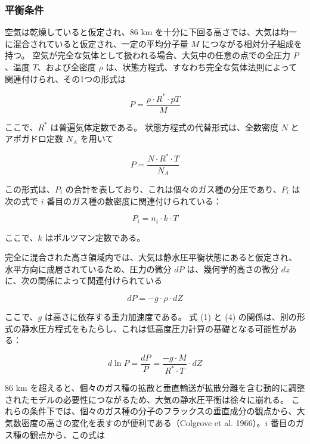 \documentclass{article}
\begin{document}
\subsubsection{平衡条件}
空気は乾燥していると仮定され、86 km を十分に下回る高さでは、大気は均一に混合されていると仮定され、一定の平均分子量 $M$ につながる相対分子組成を持つ。
空気が完全な気体として扱われる場合、大気中の任意の点での全圧力 $P$、温度 $T$、および全密度 $\rho$ は、状態方程式、すなわち完全な気体法則によって関連付けられ、その1つの形式は

\begin{equation}
  P = \frac{\rho \cdot R^* \cdot pT}{M} \tag{1}
\end{equation}

ここで、$R^*$ は普遍気体定数である。
状態方程式の代替形式は、全数密度 $N$ とアボガドロ定数 $N_A$ を用いて

\begin{equation}
  P = \frac{N \cdot R^* \cdot T}{N_A} \tag{2}
\end{equation}

この形式は、$P_i$ の合計を表しており、これは個々のガス種の分圧であり、$P_i$ は次の式で $i$ 番目のガス種の数密度に関連付けられている：

\begin{equation}
    P_i = n_i \cdot k \cdot T \tag{3}
\end{equation}

ここで、$k$ はボルツマン定数である。

完全に混合された高さ領域内では、大気は静水圧平衡状態にあると仮定され、水平方向に成層されているため、圧力の微分 $dP$ は、幾何学的高さの微分 $dz$ に、次の関係によって関連付けられている

\begin{equation}
    dP = -g \cdot \rho \cdot dZ \tag{4}
\end{equation}

ここで、$g$ は高さに依存する重力加速度である。
式 (1) と (4) の関係は、別の形式の静水圧方程式をもたらし、これは低高度圧力計算の基礎となる可能性がある：

\begin{equation}
d \ln P = \frac{dP}{P} = \frac{-g \cdot M}{R^* \cdot T} \cdot dZ \tag{5}
\end{equation}

86 km を超えると、個々のガス種の拡散と垂直輸送が拡散分離を含む動的に調整されたモデルの必要性につながるため、大気の静水圧平衡は徐々に崩れる。
これらの条件下では、個々のガス種の分子のフラックスの垂直成分の観点から、大気数密度の高さの変化を表すのが便利である（Colgrove et al. 1966）。$i$ 番目のガス種の観点から、この式は
\end{document}
